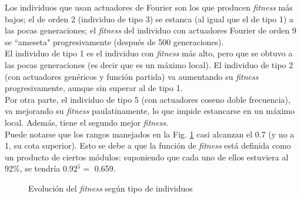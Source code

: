 \documentclass{article}
\begin{document}
Los individuos que usan actuadores de Fourier son los que producen \textit{fitness} m\'as bajos; el de orden 2 (individuo de tipo 3) se estanca (al igual que el de tipo 1) a las pocas generaciones; el \textit{fitness} del individuo con actuadores Fourier de orden 9 se ``ameseta" progresivamente (despu\'es de 500 generaciones).\\
El individuo de tipo 1 es el individuo con \textit{fitness} m\'as alto, pero que se obtuvo a las pocas generaciones (es decir que es un m\'aximo local). El individuo de tipo 2 (con actuadores gen\'ericos y funci\'on partida) va aumentando su \textit{fitness} progresivamente, aunque sin superar al de tipo 1.\\
Por otra parte, el individuo de tipo 5 (con actuadores coseno doble frecuencia), va mejorando su \textit{fitness} paulatinamente, lo que impide estancarse en un m\'aximo local. Adem\'as, tiene el segundo mejor \textit{fitness}.\\
Puede notarse que los rangos manejados en la Fig. \ref{fig:resultados_fitness} casi alcanzan el 0.7 (y no a 1, su cota superior). Esto se debe a que la funci\'on de \textit{fitness} est\'a definida como un producto de ciertos m\'odulos: suponiendo que cada uno de ellos estuviera al 92\%, se tendr\'ia  0.92$^5 =$ 0.659.
\begin{figure}[H]%
  \centering
  \caption{Evoluci\'on del \textit{fitness} seg\'un tipo de individuos}%
  \label{fig:resultados_fitness} %
\end{figure}
\end{document}
